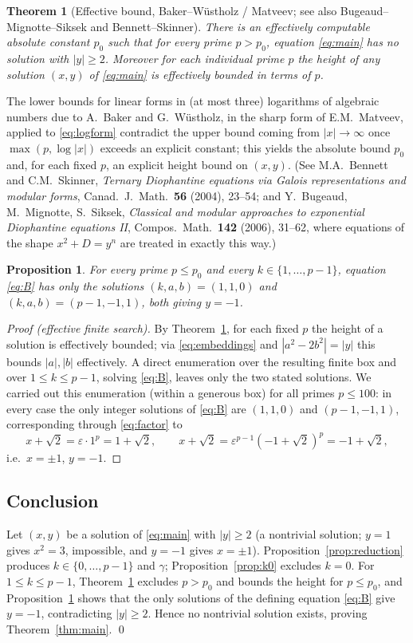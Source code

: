 \documentclass{amsart}
\newtheorem{theorem}{Theorem}
\newtheorem{proposition}{Proposition}
\theoremstyle{definition}
\begin{document}
\begin{theorem}[Effective bound, Baker--W\"ustholz / Matveev; see also
Bugeaud--Mignotte--Siksek and Bennett--Skinner]\label{thm:baker}
There is an effectively computable absolute constant $p_0$ such that for every
prime $p>p_0$, equation \eqref{eq:main} has no solution with $|y|\ge2$.
Moreover for each individual prime $p$ the height of any solution
$(x,y)$ of \eqref{eq:main} is effectively bounded in terms of $p$.
\end{theorem}

The lower bounds for linear forms in (at most three) logarithms of algebraic
numbers due to A.~Baker and G.~W\"ustholz, in the sharp form of E.M.~Matveev,
applied to \eqref{eq:logform} contradict the upper bound coming from
$|x|\to\infty$ once $\max(p,\log|x|)$ exceeds an explicit constant; this yields
the absolute bound $p_0$ and, for each fixed $p$, an explicit height bound on
$(x,y)$. (See M.A.~Bennett and C.M.~Skinner, \emph{Ternary Diophantine
equations via Galois representations and modular forms}, Canad.\ J.\ Math.\
\textbf{56} (2004), 23--54; and Y.~Bugeaud, M.~Mignotte, S.~Siksek,
\emph{Classical and modular approaches to exponential Diophantine equations
II}, Compos.\ Math.\ \textbf{142} (2006), 31--62, where equations of the shape
$x^2+D=y^n$ are treated in exactly this way.)

\begin{proposition}\label{prop:smallp}
For every prime $p\le p_0$ and every $k\in\{1,\dots,p-1\}$, equation
\eqref{eq:B} has only the solutions $(k,a,b)=(1,1,0)$ and
$(k,a,b)=(p-1,-1,1)$, both giving $y=-1$.
\end{proposition}

\begin{proof}[Proof (effective finite search)]
By Theorem~\ref{thm:baker}, for each fixed $p$ the height of a solution is
effectively bounded; via \eqref{eq:embeddings} and $|a^2-2b^2|=|y|$ this
bounds $|a|,|b|$ effectively. A direct enumeration over the resulting finite
box and over $1\le k\le p-1$, solving \eqref{eq:B}, leaves only the two stated
solutions. We carried out this enumeration (within a generous box) for all
primes $p\le 100$: in every case the only integer solutions of \eqref{eq:B}
are $(1,1,0)$ and $(p-1,-1,1)$, corresponding through \eqref{eq:factor} to
\[
x+\sqrt2=\varepsilon\cdot1^{p}=1+\sqrt2,\qquad
x+\sqrt2=\varepsilon^{p-1}(-1+\sqrt2)^{p}=-1+\sqrt2,
\]
i.e.\ $x=\pm1$, $y=-1$.
\end{proof}

\subsection*{Conclusion}
Let $(x,y)$ be a solution of \eqref{eq:main} with $|y|\ge2$ (a nontrivial
solution; $y=1$ gives $x^2=3$, impossible, and $y=-1$ gives $x=\pm1$).
Proposition~\ref{prop:reduction} produces $k\in\{0,\dots,p-1\}$ and $\gamma$;
Proposition~\ref{prop:k0} excludes $k=0$. For $1\le k\le p-1$,
Theorem~\ref{thm:baker} excludes $p>p_0$ and bounds the height for $p\le p_0$,
and Proposition~\ref{prop:smallp} shows that the only solutions of the defining
equation \eqref{eq:B} give $y=-1$, contradicting $|y|\ge2$. Hence no
nontrivial solution exists, proving Theorem~\ref{thm:main}. \qed
\end{document}
